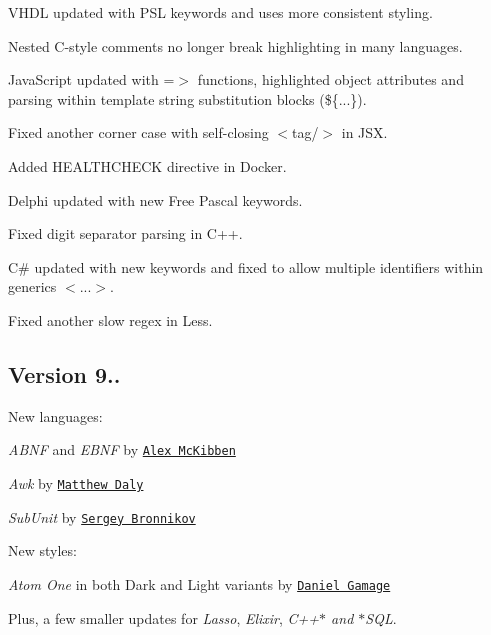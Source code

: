 \begin{DoxyItemize}
\item V\+H\+DL updated with P\+SL keywords and uses more consistent styling.
\item Nested C-\/style comments no longer break highlighting in many languages.
\item Java\+Script updated with {\ttfamily =$>$} functions, highlighted object attributes and parsing within template string substitution blocks ({\ttfamily \$\{...\}}).
\item Fixed another corner case with self-\/closing {\ttfamily $<$tag/$>$} in J\+SX.
\item Added {\ttfamily H\+E\+A\+L\+T\+H\+C\+H\+E\+CK} directive in Docker.
\item Delphi updated with new Free Pascal keywords.
\item Fixed digit separator parsing in C++.
\item C\# updated with new keywords and fixed to allow multiple identifiers within generics {\ttfamily $<$...$>$}.
\item Fixed another slow regex in Less.
\end{DoxyItemize}

\subsection*{Version 9..}

New languages\+:


\begin{DoxyItemize}
\item {\itshape A\+B\+NF} and {\itshape E\+B\+NF} by \href{https://github.com/mckibbenta}{\tt Alex Mc\+Kibben}
\item {\itshape Awk} by \href{https://github.com/matthewbdaly}{\tt Matthew Daly}
\item {\itshape Sub\+Unit} by \href{https://github.com/ligurio}{\tt Sergey Bronnikov}
\end{DoxyItemize}

New styles\+:


\begin{DoxyItemize}
\item {\itshape Atom One} in both Dark and Light variants by \href{https://github.com/danielgamage}{\tt Daniel Gamage}
\end{DoxyItemize}

Plus, a few smaller updates for {\itshape Lasso}, {\itshape Elixir}, {\itshape C++$\ast$ and $\ast$\+S\+QL}.

